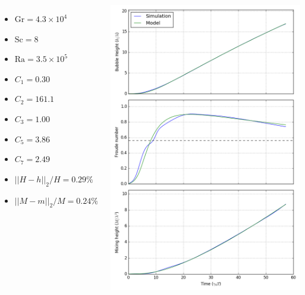 \documentclass[12pt]{beamer}
\begin{document}
\begin{frame}[plain]
\begin{columns}[c]
\begin{itemize}
  \item $\text{Gr} = 4.3 \times 10^4$
  \item $\text{Sc} = 8$
  \item $\text{Ra} = 3.5 \times 10^5$
  \item $C_1 = 0.30$
  \item $C_2 = 161.1$
  \item $C_3 = 1.00$
  \item $C_5 = 3.86$
  \item $C_7 = 2.49$
  \item $||H-h||_2/H = 0.29\%$
  \item $||M-m||_2/M = 0.24\%$
\end{itemize}
\includegraphics[height=1.05\textheight]{graphics/H-8-1.png}
\end{columns}
\end{frame}
\end{document}
